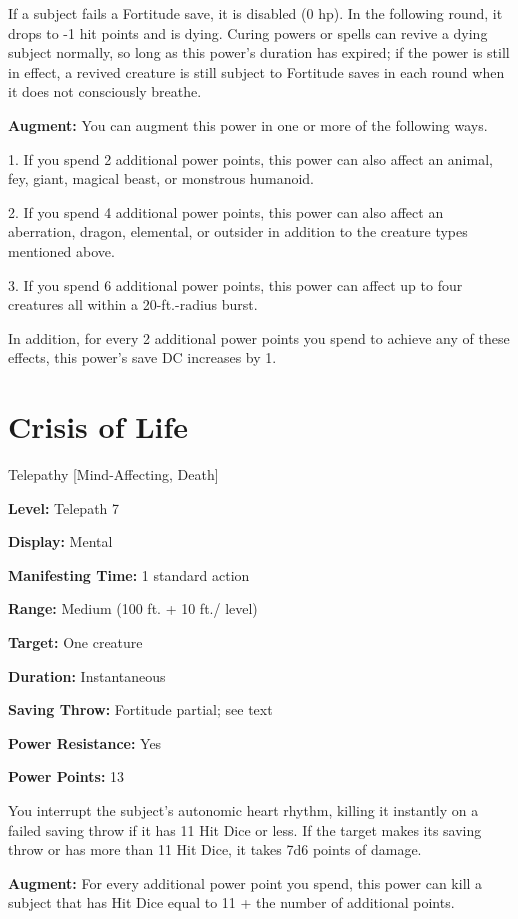 \documentclass{article}
\begin{document}
If a subject fails a Fortitude save, it is disabled (0 hp). In the following round, 
it drops to -1 hit points and is dying. Curing powers or spells can revive a dying 
subject normally, so long as this power's duration has expired; if the power is 
still in effect, a revived creature is still subject to Fortitude saves in each 
round when it does not consciously breathe.

\textbf{Augment:} You can augment this power in one or more of the following ways.

1. If you spend 2 additional power points, this power can also affect an animal, 
fey, giant, magical beast, or monstrous humanoid.

2. If you spend 4 additional power points, this power can also affect an aberration, 
dragon, elemental, or outsider in addition to the creature types mentioned above.

3. If you spend 6 additional power points, this power can affect up to four creatures 
all within a 20-ft.-radius burst.

In addition, for every 2 additional power points you spend to achieve any of these 
effects, this power's save DC increases by 1.

\vspace{12pt}
\section*{Crisis of Life}

Telepathy [Mind-Affecting, Death]

\textbf{Level:} Telepath 7

\textbf{Display:} Mental

\textbf{Manifesting Time:} 1 standard action

\textbf{Range:} Medium (100 ft. + 10 ft./ level)

\textbf{Target:} One creature

\textbf{Duration:} Instantaneous

\textbf{Saving Throw:} Fortitude partial; see text

\textbf{Power Resistance:} Yes

\textbf{Power Points:} 13

You interrupt the subject's autonomic heart rhythm, killing it instantly on a failed 
saving throw if it has 11 Hit Dice or less. If the target makes its saving throw 
or has more than 11 Hit Dice, it takes 7d6 points of damage.

\textbf{Augment:} For every additional power point you spend, this power can kill 
a subject that has Hit Dice equal to 11 + the number of additional points.
\end{document}
